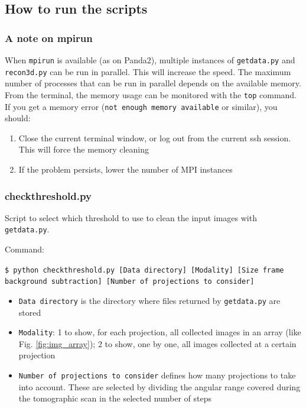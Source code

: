\documentclass[11pt]{scrartcl}
\begin{document}
\subsection{How to run the scripts}

\subsubsection{A note on mpirun}

When {\texttt{mpirun}} is available (as on Panda2), multiple instances of {\texttt{getdata.py}} and {\texttt{recon3d.py}} can be run in parallel. This will increase the speed. The maximum number of processes that can be run in parallel depends on the available memory. From the terminal, the memory usage can be monitored with the {\texttt{top}} command. If you get a memory error ({\texttt{not enough memory available}} or similar), you should:
\begin{enumerate}
\item Close the current terminal window, or log out from the current ssh session. This will force the memory cleaning
\item If the problem persists, lower the number of {\footnotesize{MPI}} instances
\end{enumerate}

\subsubsection{check\textunderscore threshold.py}

Script to select which threshold to use to clean the input images with {\texttt{getdata.py}}.

Command: 

{\texttt{\$ python check\textunderscore threshold.py [Data directory] [Modality] [Size frame background subtraction] [Number of projections to consider]}}

\begin{itemize}
    \item {\texttt{Data directory}} is the directory where files returned by {\texttt{getdata.py}} are stored
    \item {\texttt{Modality}}: 1 to show, for each projection, all collected images in an array (like Fig. \ref{fig:img_array}); 2 to show, one by one, all images collected at a certain projection
    \item {\texttt{Number of projections to consider}} defines how many projections to take into account. These are selected by dividing the angular range covered during the tomographic scan in the selected number of steps
\end{itemize}
\end{document}
